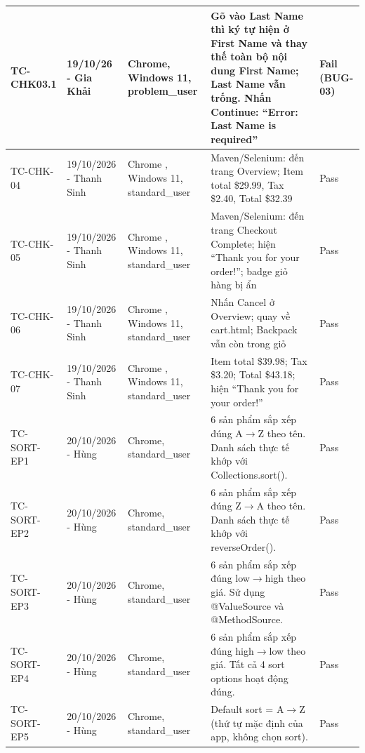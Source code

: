 {\begin{longtable}{|L{3.4cm}|L{2.6cm}|L{2.6cm}|L{4.7cm}|L{1.4cm}|}
\hline
\mbox{TC-CHK03.1} & 19/10/26 - Gia Khải & Chrome, Windows 11, problem\_\allowbreak{}user & Gõ vào Last Name thì ký tự hiện ở First Name và thay thế toàn bộ nội dung First Name; Last Name vẫn trống. Nhấn Continue: ``Error: Last Name is required'' & \textcolor{failred}{\textbf{Fail (BUG-03)}} \\
\hline
\mbox{TC-CHK-04} & 19/10/2026 - Thanh Sinh & Chrome , Windows 11, standard\_\allowbreak{}user & Maven/Selenium: đến trang Overview; Item total \$29.99, Tax \$2.40, Total \$32.39 & \textcolor{passgreen}{Pass} \\
\hline
\mbox{TC-CHK-05} & 19/10/2026 - Thanh Sinh & Chrome , Windows 11, standard\_\allowbreak{}user & Maven/Selenium: đến trang Checkout Complete; hiện ``Thank you for your order!''; badge giỏ hàng bị ẩn & \textcolor{passgreen}{Pass} \\
\hline
\mbox{TC-CHK-06} & 19/10/2026 - Thanh Sinh & Chrome , Windows 11, standard\_\allowbreak{}user & Nhấn Cancel ở Overview; quay về cart.html; Backpack vẫn còn trong giỏ & \textcolor{passgreen}{Pass} \\
\hline
\mbox{TC-CHK-07} & 19/10/2026 - Thanh Sinh & Chrome , Windows 11, standard\_\allowbreak{}user & Item total \$39.98; Tax \$3.20; Total \$43.18; hiện ``Thank you for your order!'' & \textcolor{passgreen}{Pass} \\
\hline
\mbox{TC-SORT-EP1} & 20/10/2026 - Hùng & Chrome, standard\_\allowbreak{}user & 6 sản phẩm sắp xếp đúng A$\rightarrow$Z theo tên. Danh sách thực tế khớp với Collections.sort(). & \textcolor{passgreen}{Pass} \\
\hline
\mbox{TC-SORT-EP2} & 20/10/2026 - Hùng & Chrome, standard\_\allowbreak{}user & 6 sản phẩm sắp xếp đúng Z$\rightarrow$A theo tên. Danh sách thực tế khớp với reverseOrder(). & \textcolor{passgreen}{Pass} \\
\hline
\mbox{TC-SORT-EP3} & 20/10/2026 - Hùng & Chrome, standard\_\allowbreak{}user & 6 sản phẩm sắp xếp đúng low$\rightarrow$high theo giá. Sử dụng @ValueSource và @MethodSource. & \textcolor{passgreen}{Pass} \\
\hline
\mbox{TC-SORT-EP4} & 20/10/2026 - Hùng & Chrome, standard\_\allowbreak{}user & 6 sản phẩm sắp xếp đúng high$\rightarrow$low theo giá. Tất cả 4 sort options hoạt động đúng. & \textcolor{passgreen}{Pass} \\
\hline
\mbox{TC-SORT-EP5} & 20/10/2026 - Hùng & Chrome, standard\_\allowbreak{}user & Default sort = A$\rightarrow$Z (thứ tự mặc định của app, không chọn sort). & \textcolor{passgreen}{Pass} \\

\end{longtable}}
